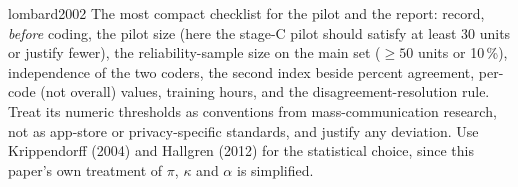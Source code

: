 \begin{papercard}{lombard2002}
 The most compact checklist for the pilot and the report: record, \emph{before} coding, the pilot size (here the stage-C pilot should satisfy at least 30 units or justify fewer), the reliability-sample size on the main set ($\ge50$ units or 10\,\%), independence of the two coders, the second index beside percent agreement, per-code (not overall) values, training hours, and the disagreement-resolution rule. Treat its numeric thresholds as conventions from mass-communication research, not as app-store or privacy-specific standards, and justify any deviation. Use Krippendorff (2004) and Hallgren (2012) for the statistical choice, since this paper's own treatment of $\pi$, $\kappa$ and $\alpha$ is simplified.
\end{papercard}
